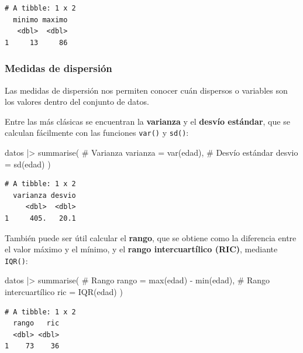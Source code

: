 \documentclass[
  spanish,
  letterpaper,
  DIV=11,
  numbers=noendperiod]{scrreprt}
\newenvironment{Shaded}{\begin{snugshade}}{\end{snugshade}}
\newcommand{\AttributeTok}[1]{\textcolor[rgb]{0.40,0.45,0.13}{#1}}
\newcommand{\CommentTok}[1]{\textcolor[rgb]{0.37,0.37,0.37}{#1}}
\newcommand{\FunctionTok}[1]{\textcolor[rgb]{0.28,0.35,0.67}{#1}}
\newcommand{\NormalTok}[1]{\textcolor[rgb]{0.00,0.23,0.31}{#1}}
\newcommand{\SpecialCharTok}[1]{\textcolor[rgb]{0.37,0.37,0.37}{#1}}
\begin{document}
\begin{verbatim}
# A tibble: 1 x 2
  minimo maximo
   <dbl>  <dbl>
1     13     86
\end{verbatim}

\subsubsection{Medidas de dispersión}\label{medidas-de-dispersiuxf3n}

Las medidas de dispersión nos permiten conocer cuán dispersos o
variables son los valores dentro del conjunto de datos.

Entre las más clásicas se encuentran la \textbf{varianza} y el
\textbf{desvío estándar}, que se calculan fácilmente con las funciones
\texttt{var()} y \texttt{sd()}:

\begin{Shaded}
\begin{Highlighting}[]
\NormalTok{datos }\SpecialCharTok{|\textgreater{}}
  \FunctionTok{summarise}\NormalTok{(}
    \CommentTok{\# Varianza}
    \AttributeTok{varianza =} \FunctionTok{var}\NormalTok{(edad),}
    \CommentTok{\# Desvío estándar}
    \AttributeTok{desvio =} \FunctionTok{sd}\NormalTok{(edad)}
\NormalTok{  )}
\end{Highlighting}
\end{Shaded}

\begin{verbatim}
# A tibble: 1 x 2
  varianza desvio
     <dbl>  <dbl>
1     405.   20.1
\end{verbatim}

También puede ser útil calcular el \textbf{rango}, que se obtiene como
la diferencia entre el valor máximo y el mínimo, y el \textbf{rango
intercuartílico (RIC)}, mediante \texttt{IQR()}:

\begin{Shaded}
\begin{Highlighting}[]
\NormalTok{datos }\SpecialCharTok{|\textgreater{}}
  \FunctionTok{summarise}\NormalTok{(}
    \CommentTok{\# Rango}
    \AttributeTok{rango =} \FunctionTok{max}\NormalTok{(edad) }\SpecialCharTok{{-}} \FunctionTok{min}\NormalTok{(edad),}
    \CommentTok{\# Rango intercuartílico}
    \AttributeTok{ric =} \FunctionTok{IQR}\NormalTok{(edad)}
\NormalTok{  )}
\end{Highlighting}
\end{Shaded}

\begin{verbatim}
# A tibble: 1 x 2
  rango   ric
  <dbl> <dbl>
1    73    36
\end{verbatim}
\end{document}
